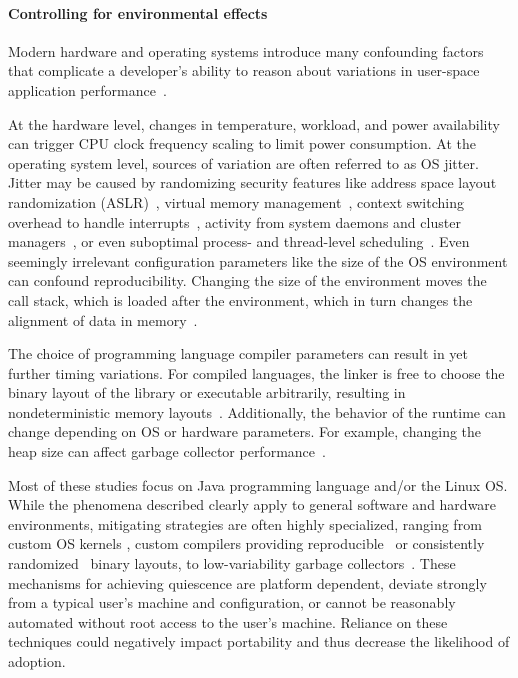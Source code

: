 \documentclass[conference]{IEEEtran}
\begin{document}

\label{sec:environment}
\paragraph{Controlling for environmental effects}
Modern hardware and operating systems introduce many confounding factors that
complicate a developer's ability to reason about variations in user-space
application performance~\cite{HP5e}.

At the hardware level, changes in temperature, workload, and power availability
can trigger CPU clock frequency scaling to limit power consumption.
At the operating system level, sources of variation are often referred to as
OS jitter.
Jitter may be caused by randomizing security features like address space layout
randomization (ASLR)~\cite{Shacham2004},
virtual memory management~\cite{Oyama2014,Oyama2016},
context switching overhead to handle interrupts~\cite{Tsafrir2007},
activity from system daemons and cluster managers~\cite{Petrini2003},
or even suboptimal process- and thread-level scheduling~\cite{Lozi2016}.
Even seemingly irrelevant configuration parameters like the size of the
OS environment can confound reproducibility. Changing the size of the
environment moves the call stack, which is loaded after the environment, which
in turn changes the alignment of data in memory~\cite{Mytkowicz2009}.

The choice of programming language compiler parameters can result in yet
further timing variations.
For compiled languages, the linker is free to choose the binary layout of the
library or executable arbitrarily, resulting in nondeterministic memory
layouts~\cite{Georges2008}.
Additionally, the behavior of the runtime can change depending on OS or hardware
parameters. For example, changing the heap size can affect garbage collector
performance~\cite{Blackburn2004}.

Most of these studies focus on Java programming language and/or the Linux OS.
While the phenomena described clearly apply to general software and hardware environments,
mitigating strategies are often highly specialized, ranging from custom OS
kernels \cite{Tessellation,Akkan2012}, custom compilers providing
reproducible~\cite{Georges2008} or consistently randomized~\cite{Curtsinger2013}
binary layouts, to low-variability garbage collectors~\cite{Huang2004}.
These mechanisms for achieving quiescence are platform dependent, deviate strongly
from a typical user's machine and configuration, or cannot be reasonably automated without
root access to the user's machine. Reliance on these techniques could negatively impact
portability and thus decrease the likelihood of adoption.
\end{document}
